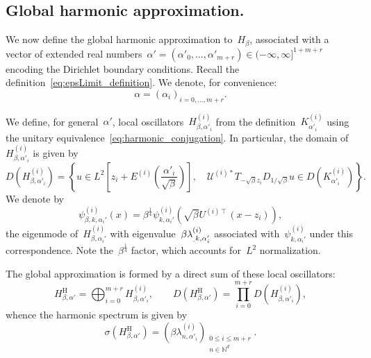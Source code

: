 \documentclass[10pt]{article}
\newcommand{\n}{\mathrm{n}}
\newcommand{\N}{\mathbb N}
\newcommand{\1}{\mathbbm 1}
\newcommand{\halfSpace}[1]{E^{(#1)}}
\newcommand{\Ki}[1]{K^{(i)}_{#1}}
\newcommand{\psii}[2]{\psi^{(i)}_{#1,#2}}
\newcommand{\lambdai}[2]{\lambda^{(i)}_{#1,#2}}
\begin{document}
    \subsection{Global harmonic approximation.\newline}\label{subsec:global_harm_operator}
    We now define the global harmonic approximation to~$H_\beta$, associated with a vector of extended real numbers~$\alpha' = (\alpha'_0,\dots,\alpha'_{m+r}) \in (-\infty,\infty]^{1+m+r}$ encoding the Dirichlet boundary conditions.
    Recall the definition~\eqref{eq:epsLimit_definition}. We denote, for convenience:
    \begin{equation}
        \label{eq:global_alpha}
        \alpha = \left(\alpha_i\right)_{i=0,\dots,m+r}.
    \end{equation}
    
    We define, for general~$\alpha'$, local oscillators~$H^{(i)}_{\beta,\alpha'_i}$ from the definition~$\Ki{\alpha'_i}$ using the unitary equivalence~\eqref{eq:harmonic_conjugation}. In particular, the domain of~$H_{\beta,\alpha'_i}^{(i)}$ is given by
    \begin{equation}
        \label{eq:local_harm_domain}
        D(H^{(i)}_{\beta,\alpha'_i}) = \left\{ u \in L^2\left[z_i + \halfSpace{i}\left(\frac{\alpha'_i}{\sqrt\beta}\right)\right],\quad  \mathcal U^{(i)*}T_{-\sqrt\beta z_i}D_{1/\sqrt\beta}u\in D(\Ki{\alpha'_i})\right\}.
    \end{equation}
    We denote by
    \begin{equation}
        \label{eq:harmonic_eigenmode}
        \psii{\beta,k}{\alpha_i'}(x) = \beta^{\frac14}\psii{k}{\alpha_i'}(\sqrt\beta U^{(i)\intercal}(x-z_i)),
    \end{equation}
    the eigenmode of~$H^{(i)}_{\beta,\alpha_i'}$ with eigenvalue~$\beta\lambdai_{k,\alpha_i'}$ associated with~$\psii{k}{\alpha_i'}$ under this correspondence. Note the~$\beta^{\frac14}$ factor, which accounts for~$L^2$ normalization.

    The global approximation is formed by a direct sum of these local oscillators:
    \begin{equation}
        \label{eq:global_harmonic_approximation_conj}
        H_{\beta,\alpha'}^{\mathrm H} = \bigoplus_{i=0}^{m+r} H^{(i)}_{\beta,\alpha'_i},\qquad D(H_{\beta,\alpha'}^{\mathrm H}) = \prod_{i=0}^{m+r} D(H^{(i)}_{\beta,\alpha'_i}),
    \end{equation}
    whence the harmonic spectrum is given by
    \begin{equation}
        \label{eq:full_harmonic_approximation_spectrum}
        \sigma(H_{\beta,\alpha'}^{\mathrm H}) = \left(\beta\lambdai{n}{\alpha'_i}\right)_{\substack{0\leq i\leq m+r\\n\in\N^d}}.
    \end{equation}
    
\end{document}
